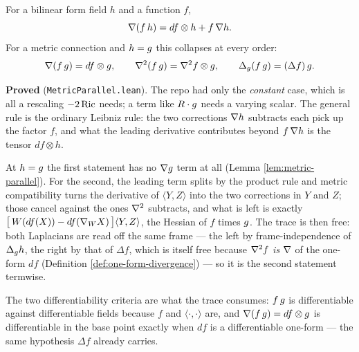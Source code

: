 \begin{lemma}
  \label{lem:fun-times-metric}
  \leanok
  For a bilinear form field $h$ and a function $f$,
  \[
    \nabla(f\,h) = df \otimes h + f\,\nabla h .
  \]
  For a metric connection and $h = g$ this collapses at every order:
  \[
    \nabla(f\,g) = df\otimes g,\qquad
    \nabla^2(f\,g) = \nabla^2 f\otimes g,\qquad
    \Delta_g(f\,g) = (\Delta f)\,g .
  \]

  \textbf{Proved} (\texttt{MetricParallel.lean}). The repo had only the \emph{constant} case,
  which is all a rescaling $-2\operatorname{Ric}$ needs; a term like $R\cdot g$ needs a varying scalar. The
  general rule is the ordinary Leibniz rule: the two corrections $\nabla h$ subtracts each pick
  up the factor $f$, and what the leading derivative contributes beyond $f\,\nabla h$ is the
  tensor $df\otimes h$.

  At $h = g$ the first statement has no $\nabla g$ term at all
  (Lemma \ref{lem:metric-parallel}). For the second, the leading term splits by the product
  rule and metric compatibility turns the derivative of $\langle Y,Z\rangle$ into the two
  corrections in $Y$ and $Z$; those cancel against the ones $\nabla^2$ subtracts, and what is
  left is exactly $\big[\,W(df(X)) - df(\nabla_W X)\,\big]\langle Y,Z\rangle$, the Hessian of
  $f$ times $g$. The trace is then free: both Laplacians are read off the same frame --- the
  left by frame-independence of $\Delta_g h$, the right by that of $\Delta f$, which is
  itself free because $\nabla^2 f$ \emph{is} $\nabla$ of the one-form $df$
  (Definition \ref{def:one-form-divergence}) --- so it is the second statement termwise.

  The two differentiability criteria are what the trace consumes: $f\,g$ is differentiable
  against differentiable fields because $f$ and $\langle\cdot,\cdot\rangle$ are, and
  $\nabla(f\,g) = df\otimes g$ is differentiable in the base point exactly when $df$ is a
  differentiable one-form --- the same hypothesis $\Delta f$ already carries.
\end{lemma}

